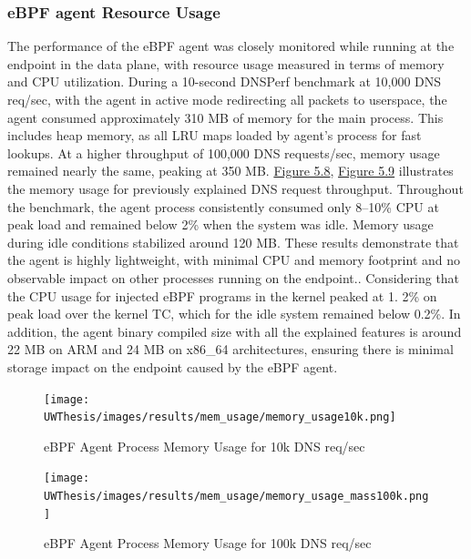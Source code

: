 \documentclass [11pt, proquest] {uwthesis}[2020/02/24]
\begin{document}
\subsubsection{eBPF agent Resource Usage}
The performance of the eBPF agent was closely monitored while running at the endpoint in the data plane, with resource usage measured in terms of memory and CPU utilization. During a 10-second DNSPerf benchmark at 10,000 DNS req/sec, with the agent in active mode redirecting all packets to userspace, the agent consumed approximately 310 MB of memory for the main process. This includes heap memory, as all LRU maps loaded by agent's process for fast lookups. At a higher throughput of 100,000 DNS requests/sec, memory usage remained nearly the same, peaking at 350 MB. \hyperref[fig:mem10k]{Figure 5.8},  \hyperref[fig:mem100k]{Figure 5.9} illustrates the memory usage for previously explained DNS request throughput. Throughout the benchmark, the agent process consistently consumed only 8–10\% CPU at peak load and remained below 2\% when the system was idle. Memory usage during idle conditions stabilized around 120 MB. These results demonstrate that the agent is highly lightweight, with minimal CPU and memory footprint and no observable impact on other processes running on the endpoint.. Considering that the CPU usage for injected eBPF programs in the kernel peaked at 1. 2\% on peak load over the kernel TC, which for the idle system remained below 0.2\%. In addition, the agent binary compiled size with all the explained features is around 22 MB on ARM and 24 MB on x86\_64 architectures, ensuring there is minimal storage impact on the endpoint caused by the eBPF agent.

\begin{figure}[H]
  \centering
  \begin{minipage}[b]{0.48\textwidth}
    \centering
    \texttt{[image: UWThesis/images/results/mem\_usage/memory\_usage10k.png]}
    \caption{eBPF Agent Process Memory Usage for 10k DNS req/sec}
    \label{fig:mem10k}
  \end{minipage}
  \hfill
  \begin{minipage}[b]{0.48\textwidth}
    \centering
    \texttt{[image: UWThesis/images/results/mem\_usage/memory\_usage\_mass100k.png]}
    \caption{eBPF Agent Process Memory Usage for 100k DNS req/sec}
    \label{fig:mem100k}
  \end{minipage}
\end{figure}
\end{document}
